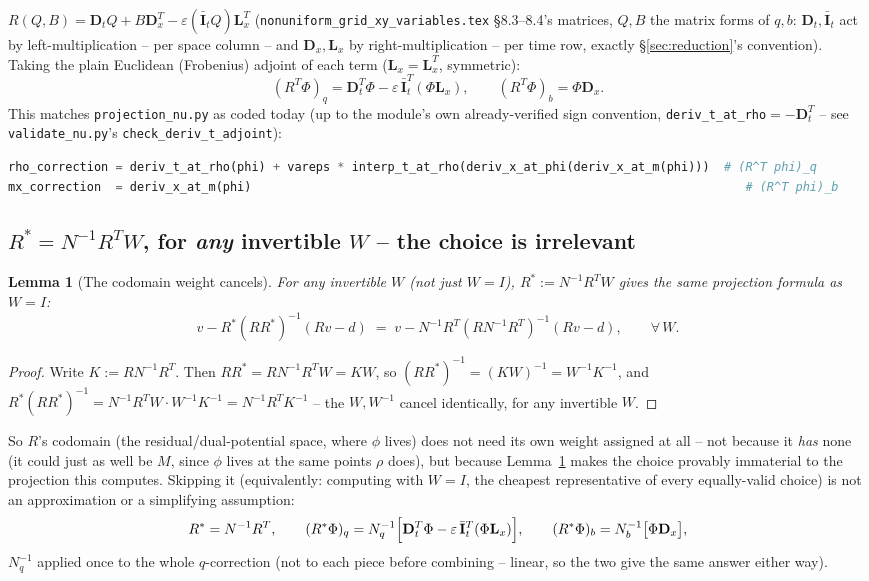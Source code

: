 \documentclass[11pt]{article}
\newtheorem{lemma}{Lemma}
\newcommand{\code}[1]{\texttt{#1}}
\begin{document}
$R(Q,B) = \mathbf D_tQ + B\mathbf D_x^T - \varepsilon(\bar{\mathbf I}_tQ)\mathbf L_x^T$
(\code{nonuniform\_grid\_xy\_variables.tex} \S8.3--8.4's matrices, $Q,B$ the matrix forms
of $q,b$: $\mathbf D_t,\bar{\mathbf I}_t$ act by left-multiplication -- per space column
-- and $\mathbf D_x,\mathbf L_x$ by right-multiplication -- per time row, exactly
\S\ref{sec:reduction}'s convention). Taking the plain Euclidean (Frobenius) adjoint of
each term ($\mathbf L_x=\mathbf L_x^T$, symmetric):
\begin{equation}
  \label{eq:R-transpose}
  (R^T\Phi)_q = \mathbf D_t^T\Phi - \varepsilon\,\bar{\mathbf I}_t^T(\Phi\mathbf L_x),
  \qquad
  (R^T\Phi)_b = \Phi\mathbf D_x.
\end{equation}
This matches \code{projection\_nu.py} as coded today (up to the module's own
already-verified sign convention, \code{deriv\_t\_at\_rho}$=-\mathbf D_t^T$ --
see \code{validate\_nu.py}'s \code{check\_deriv\_t\_adjoint}):
\begin{lstlisting}[language=Python]
rho_correction = deriv_t_at_rho(phi) + vareps * interp_t_at_rho(deriv_x_at_phi(deriv_x_at_m(phi)))  # (R^T phi)_q
mx_correction  = deriv_x_at_m(phi)                                                                     # (R^T phi)_b
\end{lstlisting}

\subsection{$R^*=N^{-1}R^TW$, for \emph{any} invertible $W$ -- the choice is irrelevant}

\begin{lemma}[The codomain weight cancels]
\label{lem:W-cancels}
For any invertible $W$ (not just $W=I$), $R^*:=N^{-1}R^TW$ gives the \emph{same}
projection formula as $W=I$:
\[
  v - R^*(RR^*)^{-1}(Rv-d) \;=\; v - N^{-1}R^T(RN^{-1}R^T)^{-1}(Rv-d), \qquad \forall\,W.
\]
\end{lemma}
\begin{proof}
Write $K:=RN^{-1}R^T$. Then $RR^*=RN^{-1}R^TW=KW$, so $(RR^*)^{-1}=(KW)^{-1}=W^{-1}K^{-1}$,
and $R^*(RR^*)^{-1}=N^{-1}R^TW\cdot W^{-1}K^{-1}=N^{-1}R^TK^{-1}$ -- the $W,W^{-1}$ cancel
identically, for any invertible $W$.
\end{proof}
So $R$'s codomain (the residual/dual-potential space, where $\phi$ lives) does not need
its own weight assigned at all -- not because it \emph{has} none (it could just as well be
$M$, since $\phi$ lives at the same points $\rho$ does), but because
Lemma~\ref{lem:W-cancels} makes the choice provably immaterial to the projection this
computes. Skipping it (equivalently: computing with $W=I$, the cheapest representative of
every equally-valid choice) is not an approximation or a simplifying assumption:
\begin{equation}
  \label{eq:R-star}
  R^* = N^{-1}R^T, \qquad
  (R^*\Phi)_q = N_q^{-1}\Bigl[\mathbf D_t^T\Phi - \varepsilon\,\bar{\mathbf I}_t^T(\Phi
  \mathbf L_x)\Bigr], \qquad
  (R^*\Phi)_b = N_b^{-1}\bigl[\Phi\mathbf D_x\bigr],
\end{equation}
$N_q^{-1}$ applied once to the whole $q$-correction (not to each piece before combining
-- linear, so the two give the same answer either way).
\end{document}
